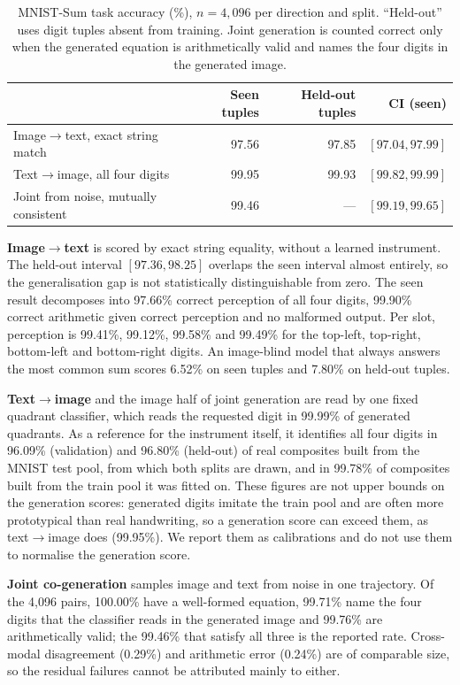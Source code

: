 \begin{table}[h]
\centering
\small
\setlength{\tabcolsep}{6pt}
\begin{tabular}{lrrr}
\toprule
& Seen tuples & Held-out tuples & CI (seen) \\
\midrule
Image$\rightarrow$text, exact string match & 97.56 & 97.85 & $[97.04, 97.99]$ \\
Text$\rightarrow$image, all four digits & 99.95 & 99.93 & $[99.82, 99.99]$ \\
Joint from noise, mutually consistent & 99.46 & --- & $[99.19, 99.65]$ \\
\bottomrule
\end{tabular}
\caption{MNIST-Sum task accuracy (\%), $n{=}4{,}096$ per direction and split. ``Held-out'' uses digit tuples
absent from training. Joint generation is counted correct only when the generated equation is
arithmetically valid and names the four digits in the generated image.}
\label{tab:app:mnist:complete}
\end{table}

\textbf{Image$\rightarrow$text} is scored by exact string equality, without a learned instrument.
The held-out interval $[97.36, 98.25]$ overlaps the seen interval almost entirely, so the
generalisation gap is not statistically distinguishable from zero. The seen result decomposes
into 97.66\% correct perception of all four digits, 99.90\% correct arithmetic given correct
perception and no malformed output. Per slot, perception is 99.41\%, 99.12\%, 99.58\% and
99.49\% for the top-left, top-right, bottom-left and bottom-right digits. An image-blind model
that always answers the most common sum scores 6.52\% on seen tuples and 7.80\% on held-out
tuples.

\textbf{Text$\rightarrow$image} and the image half of joint generation are read by one fixed
quadrant classifier, which reads the requested digit in 99.99\% of generated quadrants. As a
reference for the instrument itself, it identifies all four digits in 96.09\% (validation) and
96.80\% (held-out) of real composites built from the MNIST test pool, from which both splits are
drawn, and in 99.78\% of composites built from the train pool it was fitted on. These figures are
not upper bounds on the generation scores: generated digits imitate the train pool and are often
more prototypical than real handwriting, so a generation score can exceed them, as
text$\rightarrow$image does (99.95\%). We report them as calibrations and do not use them to
normalise the generation score.

\textbf{Joint co-generation} samples image and text from noise in one trajectory. Of the 4,096
pairs, 100.00\% have a well-formed equation, 99.71\% name the four digits that the classifier
reads in the generated image and 99.76\% are arithmetically valid; the 99.46\% that satisfy all
three is the reported rate. Cross-modal disagreement (0.29\%) and arithmetic error (0.24\%) are
of comparable size, so the residual failures cannot be attributed mainly to either.

